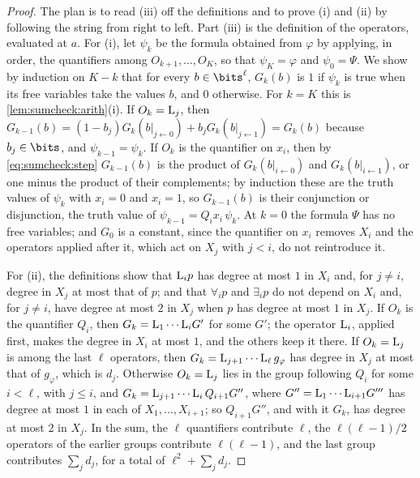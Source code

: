 \begin{refsection}
\begin{proof}
The plan is to read (iii) off the definitions and to prove (i) and (ii) by following the string from right to left. Part (iii) is the definition of the operators, evaluated at $a$. For (i), let $\psi_k$ be the formula obtained from $\varphi$ by applying, in order, the quantifiers among $O_{k+1},\dots,O_K$, so that $\psi_K=\varphi$ and $\psi_0=\Psi$. We show by induction on $K-k$ that for every $b\in\bits^\ell$, $G_k(b)$ is $1$ if $\psi_k$ is true when its free variables take the values $b$, and $0$ otherwise. For $k=K$ this is \cref{lem:sumcheck:arith}(i). If $O_k=\mathrm{L}_j$, then $G_{k-1}(b)=(1-b_j)G_k(b|_{j\gets0})+b_jG_k(b|_{j\gets1})=G_k(b)$ because $b_j\in\bits$, and $\psi_{k-1}=\psi_k$. If $O_k$ is the quantifier on $x_i$, then by \eqref{eq:sumcheck:step} $G_{k-1}(b)$ is the product of $G_k(b|_{i\gets0})$ and $G_k(b|_{i\gets1})$, or one minus the product of their complements; by induction these are the truth values of $\psi_k$ with $x_i=0$ and $x_i=1$, so $G_{k-1}(b)$ is their conjunction or disjunction, the truth value of $\psi_{k-1}=Q_ix_i\,\psi_k$. At $k=0$ the formula $\Psi$ has no free variables; and $G_0$ is a constant, since the quantifier on $x_i$ removes $X_i$ and the operators applied after it, which act on $X_j$ with $j<i$, do not reintroduce it.

For (ii), the definitions show that $\mathrm{L}_ip$ has degree at most $1$ in $X_i$ and, for $j\ne i$, degree in $X_j$ at most that of $p$; and that $\forall_ip$ and $\exists_ip$ do not depend on $X_i$ and, for $j\ne i$, have degree at most $2$ in $X_j$ when $p$ has degree at most $1$ in $X_j$. If $O_k$ is the quantifier $Q_i$, then $G_k=\mathrm{L}_1\cdots\mathrm{L}_iG'$ for some $G'$; the operator $\mathrm{L}_i$, applied first, makes the degree in $X_i$ at most $1$, and the others keep it there. If $O_k=\mathrm{L}_j$ is among the last $\ell$ operators, then $G_k=\mathrm{L}_{j+1}\cdots\mathrm{L}_\ell\,g_\varphi$ has degree in $X_j$ at most that of $g_\varphi$, which is $d_j$. Otherwise $O_k=\mathrm{L}_j$ lies in the group following $Q_i$ for some $i<\ell$, with $j\le i$, and $G_k=\mathrm{L}_{j+1}\cdots\mathrm{L}_i\,Q_{i+1}G''$, where $G''=\mathrm{L}_1\cdots\mathrm{L}_{i+1}G'''$ has degree at most $1$ in each of $X_1,\dots,X_{i+1}$; so $Q_{i+1}G''$, and with it $G_k$, has degree at most $2$ in $X_j$. In the sum, the $\ell$ quantifiers contribute $\ell$, the $\ell(\ell-1)/2$ operators of the earlier groups contribute $\ell(\ell-1)$, and the last group contributes $\sum_jd_j$, for a total of $\ell^2+\sum_jd_j$.
\end{proof}


\end{refsection}
